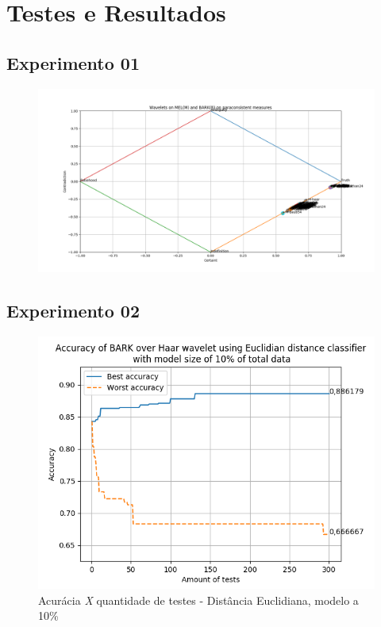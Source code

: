 \chapter{Testes e Resultados} \label{chap:testsResults}
	\begin{myenv}{1.5}
		\section{Experimento 01}
		\begin{figure}[h]
			\centering
			\includegraphics[width=0.7\linewidth]{images/results/paraconsistentPlane/Figure_1}
			\caption{}
			\label{fig:figure1}
		\end{figure}
		
		
		\newpage
		
		\section{Experimento 02}
		
		\begin{figure}[h]
			\centering
			\includegraphics{images/results/confusionMatrices/classifier_Euclidian_10}
			\caption{Acurácia \textit{X} quantidade de testes - Distância Euclidiana, modelo a 10\%}
			\label{fig:classifiereuclidian10}
		\end{figure}
		
		

\end{myenv}
